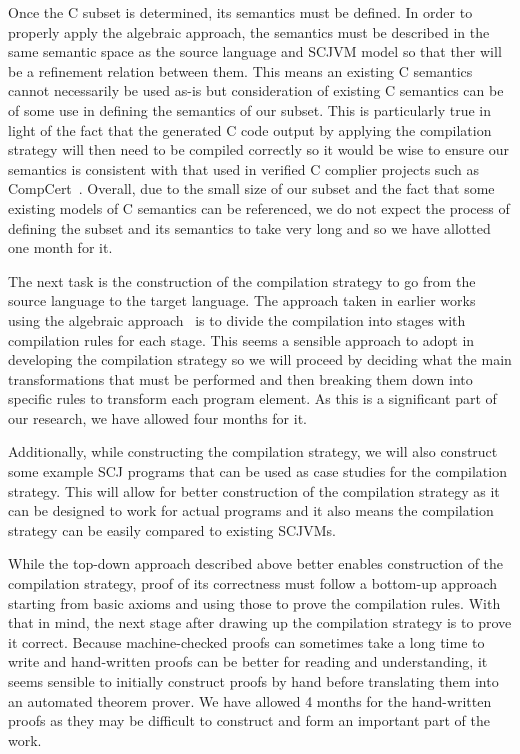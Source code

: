 \documentclass[a4paper,10pt]{report}
\begin{document}
Once the C subset is determined, its semantics must be defined.
In order to properly apply the algebraic approach, the semantics must
be described in the same semantic space as the source language and
SCJVM model so that ther will be a refinement relation between them.
This means an existing C semantics cannot necessarily be used as-is
but consideration of existing C semantics can be of some use in
defining the semantics of our subset.
This is particularly true in light of the fact that the generated C
code output by applying the compilation strategy will then need to be
compiled correctly so it would be wise to ensure our semantics is
consistent with that used in verified C complier projects such as
CompCert~\cite{leroy2009a, leroy2009b}.
Overall, due to the small size of our subset and the fact that some
existing models of C semantics can be referenced, we do not expect the
process of defining the subset and its semantics to take very long and
so we have allotted one month for it.

The next task is the construction of the compilation strategy to go
from the source language to the target language.
The approach taken in earlier works using the algebraic
approach~\cite{sampaio1993,duran2005} is to divide the compilation
into stages with compilation rules for each stage.
This seems a sensible approach to adopt in developing the compilation
strategy so we will proceed by deciding what the main transformations
that must be performed and then breaking them down into specific rules
to transform each program element.
As this is a significant part of our research, we have allowed four
months for it.

Additionally, while constructing the compilation strategy, we will
also construct some example SCJ programs that can be used as case
studies for the compilation strategy.
This will allow for better construction of the compilation strategy as
it can be designed to work for actual programs and it also means the
compilation strategy can be easily compared to existing SCJVMs.

While the top-down approach described above better enables
construction of the compilation strategy, proof of its correctness
must follow a bottom-up approach starting from basic axioms and using
those to prove the compilation rules.
With that in mind, the next stage after drawing up the compilation
strategy is to prove it correct.
Because machine-checked proofs can sometimes take a long time to write
and hand-written proofs can be better for reading and understanding,
it seems sensible to initially construct proofs by hand before
translating them into an automated theorem prover.
We have allowed 4 months for the hand-written proofs as they may be
difficult to construct and form an important part of the work.
\end{document}
